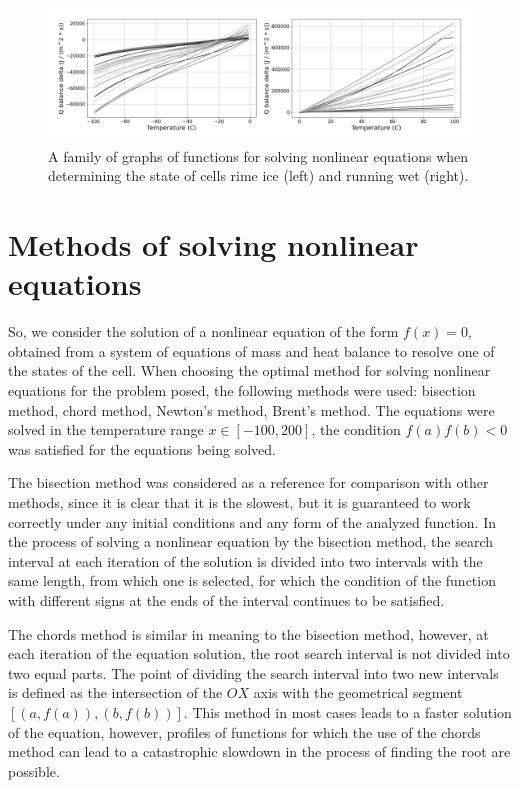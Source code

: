 \documentclass[
11pt,%
tightenlines,%
twoside,%
onecolumn,%
nofloats,%
nobibnotes,%
nofootinbib,%
superscriptaddress,%
noshowpacs,%
centertags]%
{revtex4}
\begin{document}
\begin{figure}[h]
\setcaptionmargin{5mm}
\onelinecaptionstrue
\includegraphics[width=1.0\textwidth]{pics/dq_rime_wet.pdf}
\caption{A family of graphs of functions for solving nonlinear equations when determining the state of cells rime ice (left) and running wet (right).}\label{fig:dq_rime_wet}
\end{figure}

\section{Methods of solving nonlinear equations}

So, we consider the solution of a nonlinear equation of the form $f(x) = 0$, obtained from a system of equations of mass and heat balance to resolve one of the states of the cell.
When choosing the optimal method for solving nonlinear equations for the problem posed, the following methods were used: bisection method, chord method, Newton's method, Brent's method.
The equations were solved in the temperature range $x \in [-100, 200]$, the condition $f(a)f(b) < 0$ was satisfied for the equations being solved.

The bisection method was considered as a reference for comparison with other methods, since it is clear that it is the slowest, but it is guaranteed to work correctly under any initial conditions and any form of the analyzed function.
In the process of solving a nonlinear equation by the bisection method, the search interval at each iteration of the solution is divided into two intervals with the same length, from which one is selected, for which the condition of the function with different signs at the ends of the interval continues to be satisfied.

The chords method is similar in meaning to the bisection method, however, at each iteration of the equation solution, the root search interval is not divided into two equal parts.
The point of dividing the search interval into two new intervals is defined as the intersection of the $OX$ axis with the geometrical segment $[(a, f (a)), (b, f (b))]$.
This method in most cases leads to a faster solution of the equation, however, profiles of functions for which the use of the chords method can lead to a catastrophic slowdown in the process of finding the root are possible.
\end{document}
